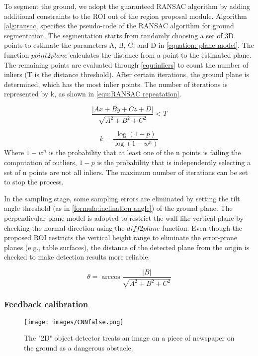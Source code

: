 \documentclass{ieeeaccess}
\begin{document}
To segment the ground, we adopt the guaranteed RANSAC algorithm by adding additional constraints to the ROI out of the region proposal module. 
Algorithm \ref{alg:ransac} specifies the pseudo-code of the RANSAC algorithm for ground segmentation. The segmentation starts from randomly choosing a set of 3D points to estimate the parameters A, B, C, and D in  \eqref{equation: plane model}. The function $point2plane$ calculates the distance from a point to the estimated plane. The remaining points are evaluated through \eqref{equ:inliers} to count the number of inliers (T is the distance threshold). After certain iterations, the ground plane is determined, which has the most inlier points. The number of iterations is represented by k, as shown in \eqref{equ:RANSAC repeatation}.

\begin{equation}
\frac{|Ax+By+Cz+D|}{\sqrt{A^2+B^2+C^2}}<T
\label{equ:inliers}
\end{equation}



\begin{equation}
k=\frac{\log(1-p)}{\log(1-w^n)} 
\label{equ:RANSAC repeatation}
\end{equation}
Where $1-w^n$ is the probability that at least one of the n points is failing the computation of outliers, $1-p$ is the probability that is independently selecting a set of n points are not all inliers. The maximum number of iterations can be set to stop the process.

In the sampling stage, some sampling errors are eliminated by setting the tilt angle threshold (as in \eqref{formula:inclination angle}) of the ground plane. The perpendicular plane model is adopted to restrict the wall-like vertical plane by checking the normal direction using the $diff2plane$ function. Even though the proposed ROI restricts the vertical height range to eliminate the error-prone planes (e.g., table surfaces), the distance of the detected plane from the origin is checked to make detection results more reliable. 


\begin{equation}
\theta=\arccos{\frac{|B|}{\sqrt{A^2+B^2+C^2}}}
\label{formula:inclination angle}
\end{equation}

\subsubsection{Feedback calibration}
\begin{figure}
    \centering
    \texttt{[image: images/CNNfalse.png]}
    \caption{The "2D" object detector treats an image on a piece of newspaper on the ground as a dangerous obstacle.}
    \label{fig:cnn-false}
\end{figure}
\end{document}
